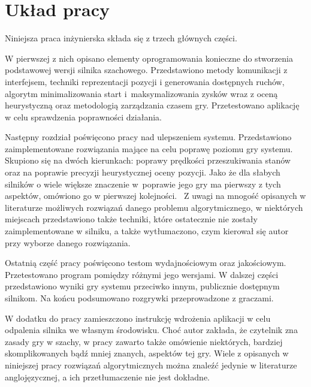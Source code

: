 \section{Układ pracy}
\label{sec:uklad-pracy}

Niniejsza praca inżynierska składa się z trzech głównych części.

W pierwszej z nich opisano elementy oprogramowania konieczne do stworzenia podstawowej wersji silnika szachowego.
Przedstawiono metody komunikacji z interfejsem, techniki reprezentacji pozycji i generowania dostępnych ruchów, algorytm minimalizowania start i~maksymalizowania zysków wraz z oceną heurystyczną oraz metodologią zarządzania czasem gry.
Przetestowano aplikację w celu sprawdzenia poprawności działania.

Następny rozdział poświęcono pracy nad ulepszeniem systemu.
Przedstawiono zaimplementowane rozwiązania mające na celu poprawę poziomu gry systemu.
Skupiono się na dwóch kierunkach: poprawy prędkości przeszukiwania stanów oraz na poprawie precyzji heurystycznej oceny pozycji.
Jako że dla słabych silników o wiele większe znaczenie w~poprawie jego gry ma pierwszy z tych aspektów, omówiono go w pierwszej kolejności.~\cite*{Vrzina2023}
Z uwagi na mnogość opisanych w literaturze możliwych rozwiązań danego problemu algorytmicznego, w niektórych miejscach przedstawiono także techniki, które ostatecznie nie zostały zaimplementowane w silniku, a także wytłumaczono, czym kierował się autor przy wyborze danego rozwiązania.

Ostatnią część pracy poświęcono testom wydajnościowym oraz jakościowym.
Przetestowano program pomiędzy różnymi jego wersjami.
W dalszej części przedstawiono wyniki gry systemu przeciwko innym, publicznie dostępnym silnikom.
Na końcu podsumowano rozgrywki przeprowadzone z graczami.

W dodatku do pracy zamieszczono instrukcję wdrożenia aplikacji w celu odpalenia silnika we własnym środowisku.
Choć autor zakłada, że czytelnik zna zasady gry w szachy, w pracy zawarto także omówienie niektórych, bardziej skomplikowanych bądź mniej znanych, aspektów tej gry.
Wiele z opisanych w niniejszej pracy rozwiązań algorytmicznych można znaleźć jedynie w literaturze anglojęzycznej, a ich przetłumaczenie nie jest dokładne.